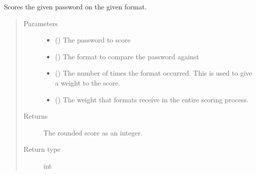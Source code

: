 \documentclass[letterpaper,10pt,english]{sphinxmanual}
\begin{document}
\begin{fulllineitems}
\begin{fulllineitems}
\end{fulllineitems}


\begin{fulllineitems}
\label{\detokenize{EntroPass:EntroPass.pwd_score.Pwd_score.score_pwd_format}}
\sphinxAtStartPar
Scores the given password on the given format.
\begin{quote}\begin{description}
\item[{Parameters}] \leavevmode\begin{itemize}
\item {} 
\sphinxAtStartPar
{} () \textendash{} The password to score

\item {} 
\sphinxAtStartPar
{} () \textendash{} The format to compare the password against

\item {} 
\sphinxAtStartPar
{} () \textendash{} The number of times the format occurred. This is used to give a weight to the score.

\item {} 
\sphinxAtStartPar
{} (\sphinxstyleliteralemphasis{\sphinxupquote{, }}) \textendash{} The weight that formats receive in the entire scoring process.

\end{itemize}

\item[{Returns}] \leavevmode
\sphinxAtStartPar
The rounded score as an integer.

\item[{Return type}] \leavevmode
\sphinxAtStartPar
int

\end{description}\end{quote}


\end{fulllineitems}
\end{fulllineitems}
\end{document}
